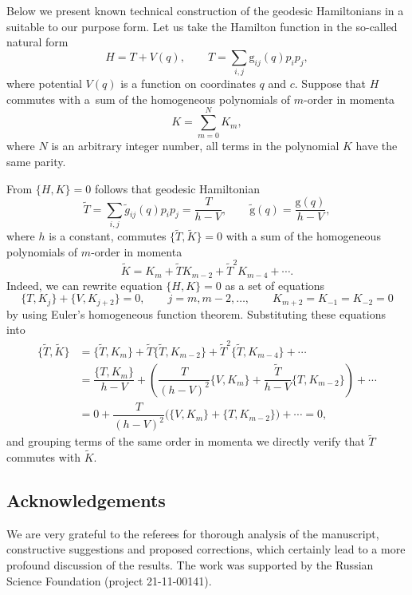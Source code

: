 \documentclass[pdftex]{sigma}
\numberwithin{equation}{section}
\begin{document}
Below we present known technical construction of the geodesic Hamiltonians in a suitable to our purpose form.
Let us take the Hamilton function in the so-called natural form
\[
H=T+V(q) ,\qquad T=\sum_{i,j} \mathrm g_{ij}(q) p_ip_j ,\]
where potential $V(q)$ is a function on coordinates $q$ and $c$. Suppose that $H$ commutes with a~sum of the homogeneous polynomials of $m$-order in momenta
\[K=\sum_{m=0}^N K_m,\]
where $N$ is an arbitrary integer number, all terms in the polynomial $K$ have the same parity.

From $\{H,K\}=0$ follows that geodesic Hamiltonian
\[\tilde{T}=\sum_{i,j}\tilde{g}_{ij}(q) p_ip_j=\dfrac{T}{h-V} ,\qquad \tilde{\mathrm g}(q)=\frac{\mathrm g(q)}{h-V},\]
where $h$ is a constant, commutes $\big\{\tilde{T},\tilde{K}\big\}=0$ with a sum of the homogeneous polynomials of $m$-order in momenta
\[
\tilde{K}=K_m+\tilde{T}K_{m-2}+\tilde{T}^2K_{m-4}+\cdots .
\]
Indeed, we can rewrite equation $\{H,K\}=0$ as a set of equations
\[
\{ T,K_j \}+\{V,K_{j+2}\}=0 ,\qquad j=m,m-2,\dots ,\qquad K_{m+2}=K_{-1}=K_{-2}=0
\]
by using Euler's homogeneous function theorem.
Substituting these equations into
\begin{align*}
\big\{\tilde{T},\tilde{K}\big\}&= \big\{\tilde{T},K_m\big\}+\tilde{T}\big\{\tilde{T},K_{m-2}\big\}+\tilde{T}^2\big\{\tilde{T},K_{m-4}\big\}+\cdots \\
&= \dfrac{\{T,K_m\}}{h-V}+\left(\dfrac{T}{(h-V)^2}\{V,K_m\}+\dfrac{\tilde{T}}{h-V}\{T,K_{m-2}\}\right)+\cdots \\
&= 0 +\dfrac{T}{(h-V)^2}\big(\{V,K_m\}+\{T,K_{m-2}\}\big)+\cdots=0 ,
\end{align*}
and grouping terms of the same order in momenta we directly verify that $\tilde{T}$ commutes with $\tilde{K}$.

\subsection*{Acknowledgements}
We are very grateful to the referees for thorough analysis of the manuscript, constructive suggestions and proposed corrections, which certainly lead to a more profound discussion of the results.
The work was supported by the Russian Science Foundation (project 21-11-00141).
\end{document}
